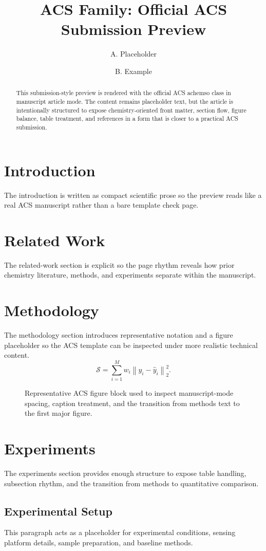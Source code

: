 \documentclass[manuscript=article]{achemso}
\author{A. Placeholder}
\affiliation{Department of Verified Templates, Placeholder Institute, Placeholder City, Country}
\author{B. Example}
\affiliation{Journal Systems Lab, Example University, Example City, Country}
\title{ACS Family: Official ACS Submission Preview}
\begin{document}
\begin{abstract}
This submission-style preview is rendered with the official ACS achemso class in manuscript article mode. The content remains placeholder text, but the article is intentionally structured to expose chemistry-oriented front matter, section flow, figure balance, table treatment, and references in a form that is closer to a practical ACS submission.
\end{abstract}
\section{Introduction}
The introduction is written as compact scientific prose so the preview reads like a real ACS manuscript rather than a bare template check page.
\section{Related Work}
The related-work section is explicit so the page rhythm reveals how prior chemistry literature, methods, and experiments separate within the manuscript.
\section{Methodology}
The methodology section introduces representative notation and a figure placeholder so the ACS template can be inspected under more realistic technical content.
\begin{equation}
\mathcal{S} = \sum_{i=1}^{M} w_i \left\| y_i - \hat{y}_i \right\|_2^2.
\end{equation}
\begin{figure}[ht]
\centering
{}
\caption{Representative ACS figure block used to inspect manuscript-mode spacing, caption treatment, and the transition from methods text to the first major figure.}
\end{figure}
\section{Experiments}
The experiments section provides enough structure to expose table handling, subsection rhythm, and the transition from methods to quantitative comparison.
\subsection{Experimental Setup}
This paragraph acts as a placeholder for experimental conditions, sensing platform details, sample preparation, and baseline methods.
\end{document}
